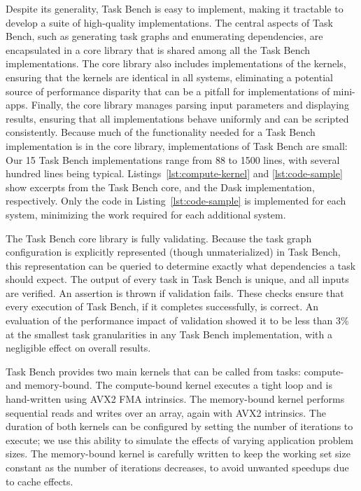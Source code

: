 Despite its generality, Task Bench is easy to implement, making it
tractable to develop a suite of high-quality implementations. The central aspects of Task Bench, such as generating
task graphs and enumerating dependencies, are encapsulated in a core
library that is shared among all the Task Bench implementations. The
core library also includes implementations of the kernels, ensuring
that the kernels are identical in all systems, eliminating a potential
source of performance disparity that can be a pitfall for
implementations of mini-apps. Finally, the core library manages
parsing input parameters and displaying results,
ensuring that all implementations behave uniformly and can
be scripted consistently. Because much of the functionality needed for
a Task Bench implementation is in the core library, implementations of
Task Bench are small: Our 15 Task Bench implementations range from 88
to 1500 lines, with several hundred lines being
typical. Listings~\ref{lst:compute-kernel} and \ref{lst:code-sample}
show excerpts from the Task Bench core, and the Dask implementation,
respectively. Only the code in Listing~\ref{lst:code-sample} is
implemented for each system, minimizing the work required for each additional system.




The Task Bench core library is fully
validating. Because the task graph configuration is explicitly
represented (though unmaterialized) in Task Bench, this representation
can be queried to determine exactly what dependencies a task should
expect. The output of every task in Task Bench is unique,
and all inputs are verified. An assertion is thrown if validation
fails. These checks ensure that every execution of Task Bench, if it
completes successfully, is correct. An evaluation of the performance impact of
validation showed it to be less than 3\% at the smallest task
granularities in any Task Bench implementation, with a negligible
effect on overall results.

Task Bench provides two main kernels that can be called from tasks:
compute- and memory-bound. The compute-bound
kernel executes a tight loop and is hand-written using AVX2 FMA
intrinsics. The memory-bound kernel performs sequential reads and
writes over an array, again with AVX2
intrinsics. The duration of both kernels can be configured by setting
the number of iterations to execute; we use this ability to simulate
the effects of varying application problem sizes. The memory-bound
kernel is carefully written to keep the working set size constant as
the number of iterations decreases, to avoid unwanted speedups due to
cache effects.
